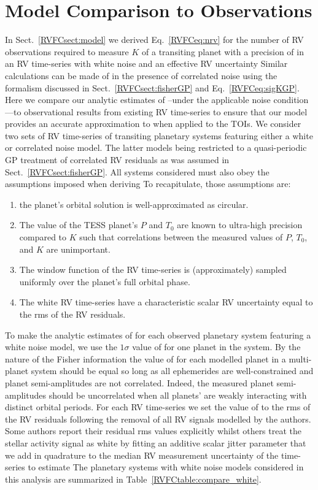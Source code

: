 \section{Model Comparison to Observations}  \label{RVFCsect:accuracy}
In Sect.~\ref{RVFCsect:model} we derived Eq.~\ref{RVFCeq:nrv} for the number of RV observations required to measure
$K$ of a transiting planet with a precision of \sigK{} in an RV time-series with white noise and an
effective RV uncertainty  Similar calculations can be made of \sigK{(}\nrv{)} in the presence of
correlated noise using the formalism discussed in Sect.~\ref{RVFCsect:fisherGP} and Eq.~\ref{RVFCeq:sigKGP}. 
Here we compare our analytic estimates of \nrv{-}--under the applicable noise condition---to
observational results from existing RV time-series to ensure that our model provides
an accurate approximation to \nrv{} when applied to the TOIs. We consider two sets of RV time-series
of transiting planetary systems featuring either a white or correlated noise model. The latter models being
restricted to a quasi-periodic GP treatment of correlated RV residuals as was assumed in Sect.~\ref{RVFCsect:fisherGP}.
All systems considered must also obey the
assumptions imposed when deriving  To recapitulate, those assumptions are:

\begin{enumerate}
\item the planet's orbital solution is well-approximated as circular.
\item The value of the TESS planet's $P$ and $T_0$ are known to ultra-high precision compared to $K$ such
  that correlations between the measured values of $P$, $T_0$, and $K$ are unimportant.
\item The window function of the RV time-series is (approximately) sampled uniformly over the planet's full
  orbital phase.
\item The white RV time-series have a characteristic scalar RV uncertainty equal to the rms of the RV residuals.
\end{enumerate}

\noindent To make the analytic estimates of \nrv{} for each observed planetary system featuring a white
noise model, we use the $1\sigma$ value of \sigK{} for one planet in the
system. By the nature of the Fisher information the value of \sigK{} for each modelled planet in a
multi-planet system should be equal so long as all ephemerides are well-constrained and
planet semi-amplitudes are not correlated. Indeed, the measured planet
semi-amplitudes should be uncorrelated when all planets' are weakly interacting with distinct orbital
periods. For each RV time-series we set the value of \sigeff{} to the
rms of the RV residuals following the removal of all RV signals modelled by the authors. Some authors
report their residual rms values explicitly whilst others treat the stellar activity signal as
white by fitting an additive scalar jitter parameter that we
add in quadrature to the median RV measurement uncertainty of the time-series to estimate 
The planetary systems with white noise models
considered in this analysis are summarized in Table~\ref{RVFCtable:compare_white}. \\

